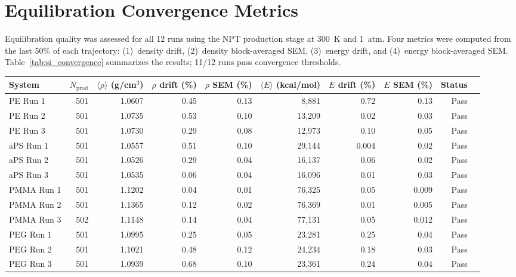 \documentclass[journal=acsami,manuscript=suppinfo]{achemso}
\begin{document}
\section{Equilibration Convergence Metrics}
\label{sec:si_convergence}

Equilibration quality was assessed for all 12 runs using the NPT production stage at 300~K and 1~atm.
Four metrics were computed from the last 50\% of each trajectory: (1)~density drift, (2)~density block-averaged SEM, (3)~energy drift, and (4)~energy block-averaged SEM.
Table~\ref{tab:si_convergence} summarizes the results; 11/12 runs pass convergence thresholds.

\begin{adjustbox}{max width=\textwidth}
\begin{tabular}{lrrrrrrrrl}
\toprule
\textbf{System} & $N_{\text{prod}}$ & $\langle \rho \rangle$ (g/cm$^3$) & $\rho$ drift (\%) & $\rho$ SEM (\%) & $\langle E \rangle$ (kcal/mol) & $E$ drift (\%) & $E$ SEM (\%) & \textbf{Status} \\
\midrule
PE Run 1   & 501  & 1.0607 & 0.45 & 0.13 & 8{,}881   & 0.72 & 0.13 & Pass \\
PE Run 2   & 501  & 1.0735 & 0.53 & 0.10 & 13{,}209  & 0.02 & 0.03 & Pass \\
PE Run 3   & 501  & 1.0730 & 0.29 & 0.08 & 12{,}973  & 0.10 & 0.05 & Pass \\
\midrule
aPS Run 1  & 501  & 1.0557 & 0.51 & 0.10 & 29{,}144  & 0.004 & 0.02 & Pass \\
aPS Run 2  & 501  & 1.0526 & 0.29 & 0.04 & 16{,}137  & 0.06 & 0.02 & Pass \\
aPS Run 3  & 501  & 1.0535 & 0.06 & 0.04 & 16{,}096  & 0.01 & 0.03 & Pass \\
\midrule
PMMA Run 1 & 501  & 1.1202 & 0.04 & 0.01 & 76{,}325  & 0.05 & 0.009 & Pass \\
PMMA Run 2 & 501  & 1.1365 & 0.12 & 0.02 & 76{,}369  & 0.01 & 0.005 & Pass \\
PMMA Run 3 & 502 & 1.1148 & 0.14 & 0.04 & 77{,}131  & 0.05 & 0.012 & Pass \\
\midrule
PEG Run 1  & 501  & 1.0995 & 0.25 & 0.05 & 23{,}281  & 0.25 & 0.04 & Pass \\
PEG Run 2  & 501  & 1.1021 & 0.48 & 0.12 & 24{,}234  & 0.18 & 0.03 & Pass \\
PEG Run 3  & 501  & 1.0939 & 0.68 & 0.10 & 23{,}361  & 0.24 & 0.04 & Pass \\
\bottomrule
\end{tabular}
\end{adjustbox}
\label{tab:si_convergence}
\end{document}
